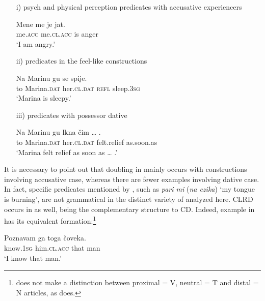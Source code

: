 \documentclass[output=paper,
colorlinks,
citecolor=brown,
newtxmath
]{langscibook}
\begin{document}
\begin{itemize}
\item[i)] psych and physical perception predicates with accusative experiencers


\ea\label{ex:zivojinovic:11}
\gll Mene   me        je  jat.\\
     me.\textsc{acc} me.\textsc{cl.acc} is  anger \\
\glt `I am angry.'
\z
\item[ii)] predicates in the feel-like constructions


\ea\label{ex:zivojinovic:12}
\gll Na Marinu     gu         se spije.\\
     to Marina.\textsc{dat} her.\textsc{cl.dat} \textsc{refl} sleep.\textsc{3sg}\\
\glt `Marina is sleepy.'
\z

    \largerpage[2]

\item[iii)] predicates with possessor dative


\ea\label{ex:zivojinovic:13}
\gll Na Marinu     gu         lkna      čim {\dots} .\\
     to Marina.\textsc{dat} her.\textsc{cl.dat} {felt.relief} {as.soon.as}\\
\glt `Marina felt relief as soon as {\dots} .'
\z

\end{itemize}

\noindent It is necessary to point out that doubling in  mainly occurs with constructions involving accusative case, whereas there are fewer examples involving dative case. In fact, specific predicates mentioned by \citet{Cinque.Krapova2008}, such as \textit{pari mi} (\textit{na ezika}) `my tongue is burning', are not grammatical in the distinct variety of  analyzed here.
CLRD occurs in  as well, being the complementary structure to CD. Indeed, example  in  has its equivalent formation:\footnote{ does not make a distinction between proximal = V, neutral = T and distal = N articles, as  does.}


\ea\label{ex:zivojinovic:14}
\gll Poznavam ga          toga čoveka.\\
     know.\textsc{1sg} him.\textsc{cl.acc} that man \\
\glt `I know that man.'
\z
\end{document}
